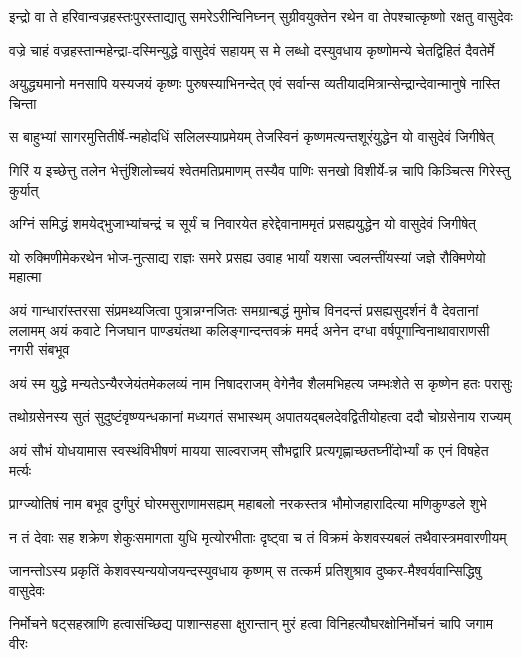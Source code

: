 \twolineshloka
{इन्द्रो वा ते हरिवान्वज्रहस्तःपुरस्ताद्यातु समरेऽरीन्विनिघ्नन्}
{सुग्रीवयुक्तेन रथेन वा तेपश्चात्कृष्णो रक्षतु वासुदेवः}


\twolineshloka
{वज्रे चाहं वज्रहस्तान्महेन्द्रा-दस्मिन्युद्धे वासुदेवं सहायम्}
{स मे लब्धो दस्युवधाय कृष्णोमन्ये चेतद्विहितं दैवतेर्मे}


\twolineshloka
{अयुद्ध्यमानो मनसापि यस्यजयं कृष्णः पुरुषस्याभिनन्देत्}
{एवं सर्वान्स व्यतीयादमित्रान्सेन्द्रान्देवान्मानुषे नास्ति चिन्ता}


\twolineshloka
{स बाहुभ्यां सागरमुत्तितीर्षे-न्महोदधिं सलिलस्याप्रमेयम्}
{तेजस्विनं कृष्णमत्यन्तशूरंयुद्धेन यो वासुदेवं जिगीषेत्}


\twolineshloka
{गिरिं य इच्छेत्तु तलेन भेत्तुंशिलोच्चयं श्वेतमतिप्रमाणम्}
{तस्यैव पाणिः सनखो विशीर्ये-न्न चापि किञ्चित्स गिरेस्तु कुर्यात्}


\twolineshloka
{अग्निं समिद्धं शमयेद्भुजाभ्यांचन्द्रं च सूर्यं च निवारयेत}
{हरेद्देवानाममृतं प्रसह्ययुद्धेन यो वासुदेवं जिगीषेत्}


\twolineshloka
{यो रुक्मिणीमेकरथेन भोज-नुत्साद्य राज्ञः समरे प्रसह्य}
{उवाह भार्यां यशसा ज्वलन्तींयस्यां जज्ञे रौक्मिणेयो महात्मा}


अयं गान्धारांस्तरसा संप्रमथ्यजित्वा पुत्रान्नग्नजितः समग्रान्बद्धं मुमोच विनदन्तं प्रसह्यसुदर्शनं वै देवतानां ललामम्
\twolineshloka
{अयं कवाटे निजघान पाण्ड्यंतथा कलिङ्गान्दन्तवक्रं ममर्द}
{अनेन दग्धा वर्षपूगान्विनाथावाराणसी नगरी संबभूव}


\twolineshloka
{अयं स्म युद्धे मन्यतेऽन्यैरजेयंतमेकलव्यं नाम निषादराजम्}
{वेगेनैव शैलमभिहत्य जम्भःशेते स कृष्णेन हतः परासुः}


\twolineshloka
{तथोग्रसेनस्य सुतं सुदुष्टंवृष्ण्यन्धकानां मध्यगतं सभास्थम्}
{अपातयद्बलदेवद्वितीयोहत्वा ददौ चोग्रसेनाय राज्यम्}


\twolineshloka
{अयं सौभं योधयामास स्वस्थंविभीषणं मायया साल्वराजम्}
{सौभद्वारि प्रत्यगृह्णाच्छतघ्नींदोर्भ्यां क एनं विषहेत मर्त्यः}


\twolineshloka
{प्राग्ज्योतिषं नाम बभूव दुर्गंपुरं घोरमसुराणामसह्यम्}
{महाबलो नरकस्तत्र भौमोजहारादित्या मणिकुण्डले शुभे}


\twolineshloka
{न तं देवाः सह शक्रेण शेकुःसमागता युधि मृत्योरभीताः}
{दृष्ट्वा च तं विक्रमं केशवस्यबलं तथैवास्त्रमवारणीयम्}


\twolineshloka
{जानन्तोऽस्य प्रकृतिं केशवस्यन्ययोजयन्दस्युवधाय कृष्णम्}
{स तत्कर्म प्रतिशुश्राव दुष्कर-मैश्वर्यवान्सिद्धिषु वासुदेवः}


\twolineshloka
{निर्मोचने षट्सहस्राणि हत्वासंच्छिद्य पाशान्सहसा क्षुरान्तान्}
{मुरं हत्वा विनिहत्यौघरक्षोनिर्मोचनं चापि जगाम वीरः}


